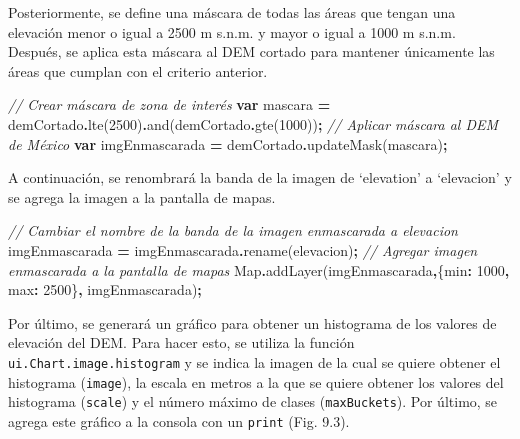 \documentclass[
  12pt,
  letterpaper,
  twoside]{book}
\newenvironment{Shaded}{\begin{snugshade}}{\end{snugshade}}
\newcommand{\BuiltInTok}[1]{#1}
\newcommand{\CommentTok}[1]{\textcolor[rgb]{0.56,0.35,0.01}{\textit{#1}}}
\newcommand{\DataTypeTok}[1]{\textcolor[rgb]{0.13,0.29,0.53}{#1}}
\newcommand{\DecValTok}[1]{\textcolor[rgb]{0.00,0.00,0.81}{#1}}
\newcommand{\FunctionTok}[1]{\textcolor[rgb]{0.00,0.00,0.00}{#1}}
\newcommand{\KeywordTok}[1]{\textcolor[rgb]{0.13,0.29,0.53}{\textbf{#1}}}
\newcommand{\NormalTok}[1]{#1}
\newcommand{\OperatorTok}[1]{\textcolor[rgb]{0.81,0.36,0.00}{\textbf{#1}}}
\newcommand{\StringTok}[1]{\textcolor[rgb]{0.31,0.60,0.02}{#1}}
\begin{document}
Posteriormente, se define una máscara de todas las áreas que tengan una elevación menor o igual a 2500 m s.n.m. y mayor o igual a 1000 m s.n.m. Después, se aplica esta máscara al DEM cortado para mantener únicamente las áreas que cumplan con el criterio anterior.

\begin{Shaded}
\begin{Highlighting}[]
\CommentTok{// Crear máscara de zona de interés}
\KeywordTok{var}\NormalTok{ mascara }\OperatorTok{=}\NormalTok{ demCortado}\OperatorTok{.}\FunctionTok{lte}\NormalTok{(}\DecValTok{2500}\NormalTok{)}\OperatorTok{.}\FunctionTok{and}\NormalTok{(demCortado}\OperatorTok{.}\FunctionTok{gte}\NormalTok{(}\DecValTok{1000}\NormalTok{))}\OperatorTok{;}
\CommentTok{// Aplicar máscara al DEM de México}
\KeywordTok{var}\NormalTok{ imgEnmascarada }\OperatorTok{=}\NormalTok{ demCortado}\OperatorTok{.}\FunctionTok{updateMask}\NormalTok{(mascara)}\OperatorTok{;}
\end{Highlighting}
\end{Shaded}

A continuación, se renombrará la banda de la imagen de `elevation' a `elevacion' y se agrega la imagen a la pantalla de mapas.

\begin{Shaded}
\begin{Highlighting}[]
\CommentTok{// Cambiar el nombre de la banda de la imagen enmascarada a elevacion}
\NormalTok{imgEnmascarada }\OperatorTok{=}\NormalTok{ imgEnmascarada}\OperatorTok{.}\FunctionTok{rename}\NormalTok{(}\StringTok{\textquotesingle{}elevacion\textquotesingle{}}\NormalTok{)}\OperatorTok{;}
\CommentTok{// Agregar imagen enmascarada a la pantalla de mapas}
\BuiltInTok{Map}\OperatorTok{.}\FunctionTok{addLayer}\NormalTok{(imgEnmascarada}\OperatorTok{,}\NormalTok{\{}\DataTypeTok{min}\OperatorTok{:} \DecValTok{1000}\OperatorTok{,} \DataTypeTok{max}\OperatorTok{:} \DecValTok{2500}\NormalTok{\}}\OperatorTok{,} \StringTok{\textquotesingle{}imgEnmascarada\textquotesingle{}}\NormalTok{)}\OperatorTok{;}
\end{Highlighting}
\end{Shaded}

Por último, se generará un gráfico para obtener un histograma de los valores de elevación del DEM. Para hacer esto, se utiliza la función \texttt{ui.Chart.image.histogram} y se indica la imagen de la cual se quiere obtener el histograma (\texttt{image}), la escala en metros a la que se quiere obtener los valores del histograma (\texttt{scale}) y el número máximo de clases (\texttt{maxBuckets}). Por último, se agrega este gráfico a la consola con un \texttt{print} (Fig. 9.3).
\end{document}
